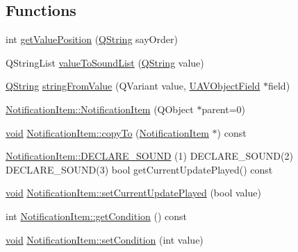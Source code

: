\subsection*{\-Functions}
\begin{DoxyCompactItemize}
\item 
int \hyperlink{group___notify_plugin_ga86b5587da919e4abd0c5045f8eef27ae}{get\-Value\-Position} (\hyperlink{group___u_a_v_objects_plugin_gab9d252f49c333c94a72f97ce3105a32d}{\-Q\-String} say\-Order)
\item 
\-Q\-String\-List \hyperlink{group___notify_plugin_ga52304989291ca82805ab0749694bfbce}{value\-To\-Sound\-List} (\hyperlink{group___u_a_v_objects_plugin_gab9d252f49c333c94a72f97ce3105a32d}{\-Q\-String} value)
\item 
\hyperlink{group___u_a_v_objects_plugin_gab9d252f49c333c94a72f97ce3105a32d}{\-Q\-String} \hyperlink{group___notify_plugin_ga16f7f909377f59dda529965c201a37a8}{string\-From\-Value} (\-Q\-Variant value, \hyperlink{class_u_a_v_object_field}{\-U\-A\-V\-Object\-Field} $\ast$field)
\item 
\hyperlink{group___notify_plugin_ga382be87567eab960b4bd89e2c7238ba8}{\-Notification\-Item\-::\-Notification\-Item} (\-Q\-Object $\ast$parent=0)
\item 
\hyperlink{group___u_a_v_objects_plugin_ga444cf2ff3f0ecbe028adce838d373f5c}{void} \hyperlink{group___notify_plugin_ga308d07be5a887bb4e35319a55c70fb06}{\-Notification\-Item\-::copy\-To} (\hyperlink{class_notification_item}{\-Notification\-Item} $\ast$) const 
\item 
\hyperlink{group___notify_plugin_gafd8fcfb284be8c92e29aba742748d4b8}{\-Notification\-Item\-::\-D\-E\-C\-L\-A\-R\-E\-\_\-\-S\-O\-U\-N\-D} (1) \-D\-E\-C\-L\-A\-R\-E\-\_\-\-S\-O\-U\-N\-D(2) \-D\-E\-C\-L\-A\-R\-E\-\_\-\-S\-O\-U\-N\-D(3) bool get\-Current\-Update\-Played() const 
\item 
\hyperlink{group___u_a_v_objects_plugin_ga444cf2ff3f0ecbe028adce838d373f5c}{void} \hyperlink{group___notify_plugin_ga3df23419f46ace03f4874972e2a14579}{\-Notification\-Item\-::set\-Current\-Update\-Played} (bool value)
\item 
int \hyperlink{group___notify_plugin_ga04c987109a0ab4c1f9d719a6c0e3096a}{\-Notification\-Item\-::get\-Condition} () const 
\item 
\hyperlink{group___u_a_v_objects_plugin_ga444cf2ff3f0ecbe028adce838d373f5c}{void} \hyperlink{group___notify_plugin_gab14a508f3cd7fd060939a7c8320b35e2}{\-Notification\-Item\-::set\-Condition} (int value)
\item 

\end{DoxyCompactItemize}
